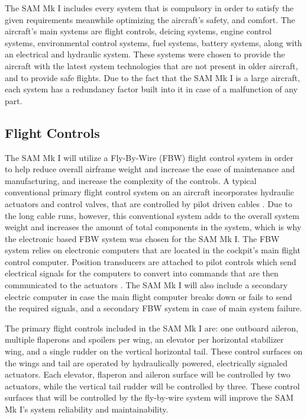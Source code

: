 The SAM Mk I includes every system that is compulsory in order to satisfy the given requirements meanwhile optimizing the aircraft's safety, and comfort. The aircraft's main systems are flight controls, deicing systems, engine control systems, environmental control systems, fuel systems, battery systems, along with an electrical and hydraulic system. These systems were chosen to provide the aircraft with the latest system technologies that are not present in older aircraft, and to provide safe flights. Due to the fact that the SAM Mk I is a large aircraft, each system has a redundancy factor built into it in case of a malfunction of any part. 

\subsection{Flight Controls}
The SAM Mk I will utilize a Fly-By-Wire (FBW) flight control system in order to help reduce overall airframe weight and increase the ease of maintenance and manufacturing, and increase the complexity of the controls. A typical conventional primary flight control system on an aircraft incorporates hydraulic actuators and control valves, that are controlled by pilot driven cables \cite{fbw}. Due to the long cable runs, however, this conventional system adds to the overall system weight and increases the amount of total components in the system, which is why the electronic based FBW system was chosen for the SAM Mk I. The FBW system relies on electronic computers that are located in the cockpit’s main flight control computer. Position transducers are attached to pilot controls which send electrical signals for the computers to convert into commands that are then communicated to the actuators \cite{fbw}. The SAM Mk I will also include a secondary electric computer in case the main flight computer breaks down or fails to send the required signals, and a secondary FBW system in case of main system failure.

The primary flight controls included in the SAM Mk I are: one outboard aileron, multiple flaperons and spoilers per wing, an elevator per horizontal stabilizer wing, and a single rudder on the vertical horizontal tail. These control surfaces on the wings and tail are operated by hydraulically powered, electrically signaled actuators. Each elevator, flaperon and aileron surface will be controlled by two actuators, while the vertical tail rudder will be controlled by three. These control surfaces that will be controlled by the fly-by-wire system will improve the SAM Mk I’s system reliability and maintainability.

